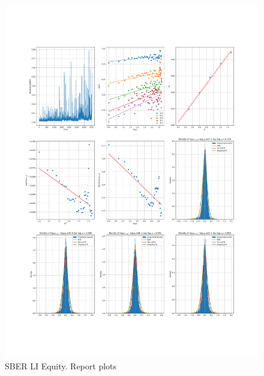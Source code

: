     \begin{figure}[h]
        \centering
        \includegraphics[width=\textwidth]{fig/SBER LI Equity.pdf}
        \caption{SBER LI Equity. Report plots}
    \end{figure} 

